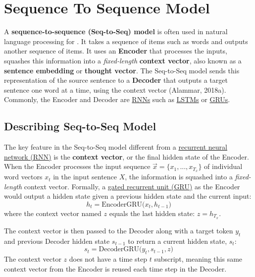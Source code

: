 \section{Sequence To Sequence Model} \label{sec:Seq2Seq}

A \textbf{sequence-to-sequence (Seq-to-Seq) model} is often used in natural language processing for . It takes a sequence of items such as words and outputs another sequence of items. It uses an \textbf{Encoder} that processes the inputs, squashes this information into a \emph{fixed-length} \textbf{context vector}, also known as a \textbf{sentence embedding} or \textbf{thought vector}. The Seq-to-Seq model sends this representation of the source sentence to a \textbf{Decoder} that outputs a target sentence one word at a time, using the context vector (Alammar, 2018a). Commonly, the Encoder and Decoder are \hyperref[sec:RNN]{RNNs} such as \hyperref[sec:LSTM]{LSTMs} or \hyperref[sec:GRU]{GRUs}.


\subsection{Describing Seq-to-Seq Model}

The key feature in the Seq-to-Seq model different from a \hyperref[sec:RNN]{recurrent neural network (RNN)} is the \textbf{context vector}, or the final hidden state of the Encoder. When the Encoder processes the input sequence $\overrightarrow{x} = \{ x_1, ..., x_{T_x} \}$ of individual word vectors $x_t$ in the input sentence $X$, the information is squashed into a \emph{fixed-length} context vector. Formally, a \hyperref[sec:GRU]{gated recurrent unit (GRU)} as the Encoder would output a hidden state given a previous hidden state and the current input: 
$$
h_t = \text{EncoderGRU} \Big( x_t, h_{t-1} \Big)
$$ 
where the context vector named $z$ equals the last hidden state: $z = h_{T_x}$. 
  
The context vector is then passed to the Decoder along with a target token $y_t$ and previous Decoder hidden state $s_{t-1}$ to return a current hidden state, $s_t$:
$$
s_t = \text{DecoderGRU} \Big( y_t, s_{t-1}, z \Big)
$$
The context vector $z$ does not have a time step $t$ subscript, meaning this same context vector from the Encoder is reused each time step in the Decoder. 


